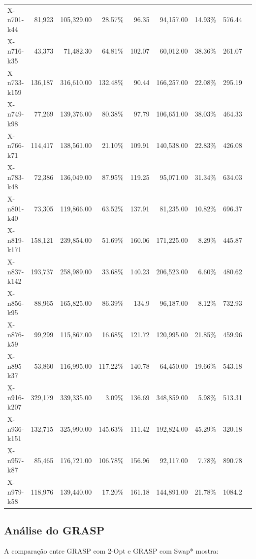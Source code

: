 \documentclass[12pt,a4paper]{article}
\begin{document}
\begin{longtable}{@{}lrrrrrrrr@{}}
    X-n701-k44 & 81,923 & 105,329.00 & 28.57\% & 96.35 & 94,157.00 & 14.93\% & 576.44 \\
    X-n716-k35 & 43,373 & 71,482.30 & 64.81\% & 102.07 & 60,012.00 & 38.36\% & 261.07 \\
    X-n733-k159 & 136,187 & 316,610.00 & 132.48\% & 90.44 & 166,257.00 & 22.08\% & 295.19 \\
    X-n749-k98 & 77,269 & 139,376.00 & 80.38\% & 97.79 & 106,651.00 & 38.03\% & 464.33 \\
    X-n766-k71 & 114,417 & 138,561.00 & 21.10\% & 109.91 & 140,538.00 & 22.83\% & 426.08 \\
    X-n783-k48 & 72,386 & 136,049.00 & 87.95\% & 119.25 & 95,071.00 & 31.34\% & 634.03 \\
    X-n801-k40 & 73,305 & 119,866.00 & 63.52\% & 137.91 & 81,235.00 & 10.82\% & 696.37 \\
    X-n819-k171 & 158,121 & 239,854.00 & 51.69\% & 160.06 & 171,225.00 & 8.29\% & 445.87 \\
    X-n837-k142 & 193,737 & 258,989.00 & 33.68\% & 140.23 & 206,523.00 & 6.60\% & 480.62 \\
    X-n856-k95 & 88,965 & 165,825.00 & 86.39\% & 134.9 & 96,187.00 & 8.12\% & 732.93 \\
    X-n876-k59 & 99,299 & 115,867.00 & 16.68\% & 121.72 & 120,995.00 & 21.85\% & 459.96 \\
    X-n895-k37 & 53,860 & 116,995.00 & 117.22\% & 140.78 & 64,450.00 & 19.66\% & 543.18 \\
    X-n916-k207 & 329,179 & 339,335.00 & 3.09\% & 136.69 & 348,859.00 & 5.98\% & 513.31 \\
    X-n936-k151 & 132,715 & 325,990.00 & 145.63\% & 111.42 & 192,824.00 & 45.29\% & 320.18 \\
    X-n957-k87 & 85,465 & 176,721.00 & 106.78\% & 156.96 & 92,117.00 & 7.78\% & 890.78 \\
    X-n979-k58 & 118,976 & 139,440.00 & 17.20\% & 161.18 & 144,891.00 & 21.78\% & 1084.2 \\
\end{longtable}

\subsection{Análise do GRASP}

A comparação entre GRASP com 2-Opt e GRASP com Swap* mostra:
\end{document}
